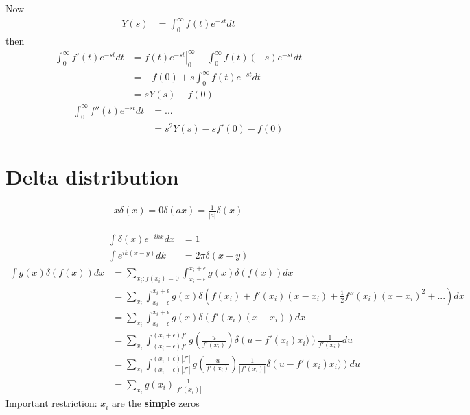\documentclass[10pt,a4paper]{book}
\theoremstyle{definition}
\begin{document}
Now
\begin{align}
Y(s)&=\int_0^\infty f(t)e^{-st}dt
\end{align}
then
\begin{align}
\int_0^\infty f'(t)e^{-st}dt
&=\left.f(t)e^{-st}\right|_0^\infty-\int_0^\infty f(t)(-s)e^{-st}dt\\
&=-f(0)+s\int_0^\infty f(t)e^{-st}dt\\
&=sY(s)-f(0)
\end{align}
\begin{align}
\int_0^\infty f''(t)e^{-st}dt
&=...\\
&=s^2Y(s)-sf'(0)-f(0)
\end{align}

\section{Delta distribution}
\begin{align}
x\delta(x)=0
\delta(ax)=\frac{1}{|a|}\delta(x)
\end{align}

\begin{align}
    \int\delta(x)e^{-ikx}dx&=1\\
    \int e^{ik(x-y)}dk&=2\pi\delta(x-y)
\end{align}
\begin{align}
    \int g(x)\delta(f(x))dx &= \sum_{x_i:f(x_i)=0}\int_{x_i-\epsilon}^{x_i+\epsilon} g(x)\delta(f(x))dx\\
    &= \sum_{x_i}\int_{x_i-\epsilon}^{x_i+\epsilon} g(x)\delta\left(f(x_i)+f'(x_i)(x-x_i)+\frac{1}{2}f''(x_i)(x-x_i)^2+...\right)dx\\
    &= \sum_{x_i}\int_{x_i-\epsilon}^{x_i+\epsilon} g(x)\delta\left(f'(x_i)(x-x_i)\right)dx\\
    &= \sum_{x_i}\int_{(x_i-\epsilon)f'}^{(x_i+\epsilon)f'} g\left(\frac{u}{f'(x_i)}\right)\delta\left(u-f'(x_i)x_i)\right)\frac{1}{f'(x_i)}du\\
    &= \sum_{x_i}\int_{(x_i-\epsilon)|f'|}^{(x_i+\epsilon)|f'|} g\left(\frac{u}{f'(x_i)}\right)\frac{1}{|f'(x_i)|}\delta\left(u-f'(x_i)x_i)\right)du\\
    &= \sum_{x_i} g(x_i)\frac{1}{|f'(x_i)|}
\end{align}
Important restriction: $x_i$ are the {\bf simple} zeros
\end{document}
